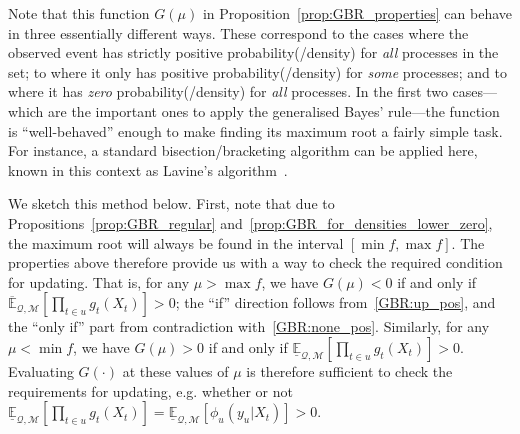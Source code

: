 \documentclass[twoside,11pt]{article}
\makeatletter
\newcommand{\reals}{\mathbb{R}}
\newcommand{\lexp}{\underline{\mathbb{E}}_{\rateset,\mathcal{M}}}
\newcommand{\uexp}{\overline{\mathbb{E}}_{\rateset,\mathcal{M}}}
\newcommand{\rateset}{\mathcal{Q}}
\newcommand{\customlabel}[2]{%
   \protected@write \@auxout {}{\string \newlabel {#1}{{#2}{\thepage}{#2}{#1}{}} }%
   \hypertarget{#1}{\emph{#2}\!}
}
\makeatother
\begin{document}
\begin{proposition}
%
%
%
\end{proposition}

Note that this function $G(\mu)$ in Proposition~\ref{prop:GBR_properties} can behave in three essentially different ways. These correspond to the cases where the observed event has strictly positive probability(/density) for \emph{all} processes in the set; to where it only has positive probability(/density) for \emph{some} processes; and to where it has \emph{zero} probability(/density) for \emph{all} processes.
In the first two cases---which are the important ones to apply the generalised Bayes' rule---the function is ``well-behaved'' enough to make finding its maximum root a fairly simple task. For instance, a standard bisection/bracketing algorithm can be applied here, known in this context as Lavine's algorithm~\citep{cozman1997alternatives}.

We sketch this method below. First, note that due to Propositions~\ref{prop:GBR_regular} and~\ref{prop:GBR_for_densities_lower_zero}, the maximum root will always be found in the interval $[\min f, \max f]$. The properties above therefore provide us with a way to check the required condition for updating. That is, for any $\mu>\max f$, we have $G(\mu)<0$ if and only if $\uexp[\prod_{t\in u} g_{t}(X_{t})]>0$; the ``if'' direction follows from~\ref{GBR:up_pos}, and the ``only if'' part from contradiction with~\ref{GBR:none_pos}. Similarly, for any $\mu < \min f$, we have $G(\mu)>0$ if and only if $\lexp[\prod_{t\in u} g_{t}(X_{t})]>0$. Evaluating $G(\cdot)$ at these values of $\mu$ is therefore sufficient to check the requirements for updating, e.g. whether or not $\lexp[\prod_{t\in u}g_t(X_t)]=\lexp[\phi_u(y_u\vert X_t)]>0$. %
\end{document}
